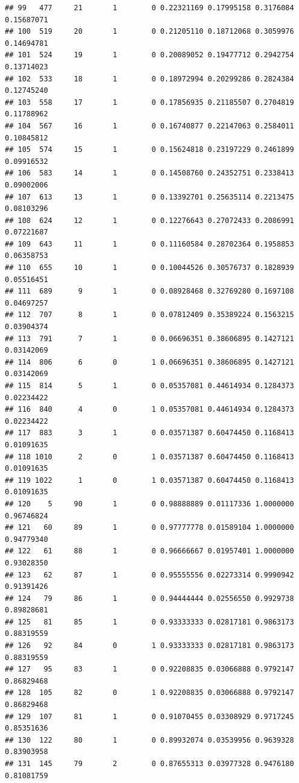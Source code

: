\documentclass[
]{book}
\begin{document}
\begin{verbatim}
## 99   477     21       1        0 0.22321169 0.17995158 0.3176084 0.15687071
## 100  519     20       1        0 0.21205110 0.18712068 0.3059976 0.14694781
## 101  524     19       1        0 0.20089052 0.19477712 0.2942754 0.13714023
## 102  533     18       1        0 0.18972994 0.20299286 0.2824384 0.12745240
## 103  558     17       1        0 0.17856935 0.21185507 0.2704819 0.11788962
## 104  567     16       1        0 0.16740877 0.22147063 0.2584011 0.10845812
## 105  574     15       1        0 0.15624818 0.23197229 0.2461899 0.09916532
## 106  583     14       1        0 0.14508760 0.24352751 0.2338413 0.09002006
## 107  613     13       1        0 0.13392701 0.25635114 0.2213475 0.08103296
## 108  624     12       1        0 0.12276643 0.27072433 0.2086991 0.07221687
## 109  643     11       1        0 0.11160584 0.28702364 0.1958853 0.06358753
## 110  655     10       1        0 0.10044526 0.30576737 0.1828939 0.05516451
## 111  689      9       1        0 0.08928468 0.32769280 0.1697108 0.04697257
## 112  707      8       1        0 0.07812409 0.35389224 0.1563215 0.03904374
## 113  791      7       1        0 0.06696351 0.38606895 0.1427121 0.03142069
## 114  806      6       0        1 0.06696351 0.38606895 0.1427121 0.03142069
## 115  814      5       1        0 0.05357081 0.44614934 0.1284373 0.02234422
## 116  840      4       0        1 0.05357081 0.44614934 0.1284373 0.02234422
## 117  883      3       1        0 0.03571387 0.60474450 0.1168413 0.01091635
## 118 1010      2       0        1 0.03571387 0.60474450 0.1168413 0.01091635
## 119 1022      1       0        1 0.03571387 0.60474450 0.1168413 0.01091635
## 120    5     90       1        0 0.98888889 0.01117336 1.0000000 0.96746824
## 121   60     89       1        0 0.97777778 0.01589104 1.0000000 0.94779340
## 122   61     88       1        0 0.96666667 0.01957401 1.0000000 0.93028350
## 123   62     87       1        0 0.95555556 0.02273314 0.9990942 0.91391426
## 124   79     86       1        0 0.94444444 0.02556550 0.9929738 0.89828681
## 125   81     85       1        0 0.93333333 0.02817181 0.9863173 0.88319559
## 126   92     84       0        1 0.93333333 0.02817181 0.9863173 0.88319559
## 127   95     83       1        0 0.92208835 0.03066888 0.9792147 0.86829468
## 128  105     82       0        1 0.92208835 0.03066888 0.9792147 0.86829468
## 129  107     81       1        0 0.91070455 0.03308929 0.9717245 0.85351636
## 130  122     80       1        0 0.89932074 0.03539956 0.9639328 0.83903958
## 131  145     79       2        0 0.87655313 0.03977328 0.9476180 0.81081759

\end{verbatim}
\end{document}
